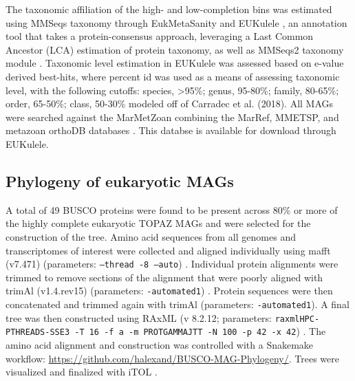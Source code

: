 \documentclass[12pt]{article}
\numberwithin{equation}{section}
\begin{document}
The taxonomic affiliation of the high- and low-completion bins was estimated using MMSeqs taxonomy through EukMetaSanity and EUKulele \citep{Krinos2021EUKulele}, an annotation tool that takes a protein-consensus approach, leveraging a Last Common Ancestor (LCA) estimation of protein taxonomy, as well as MMSeqs2 taxonomy module \citep{Steinegger2017, Steinegger2018, Mirdita2019}. Taxonomic level estimation in EUKulele was assessed based on e-value derived best-hits, where percent id was used as a means of assessing taxonomic level, with the following cutoffs: species, >95\%; genus, 95-80\%; family, 80-65\%; order, 65-50\%; class, 50-30\% modeled off of Carradec et al. (2018). All MAGs were searched against the MarMetZoan combining the MarRef, MMETSP, and metazoan orthoDB databases \citep{Johnson2018Re-assembly, Keeling2014, Kriventseva2018, Klemetsen:2017fg}. This databse is available for download through EUKulele. 

\subsection*{Phylogeny of eukaryotic MAGs} 
A total of 49 BUSCO proteins were found to be present across 80\% or more of the highly complete eukaryotic TOPAZ MAGs and were selected for the construction of the tree. Amino acid sequences from all genomes and transcriptomes of interest were collected and aligned individually using mafft (v7.471) (parameters: \texttt{--thread -8 –auto}) \citep{Katoh2013MAFFT}. Individual protein alignments were trimmed to remove sections of the alignment that were poorly aligned with trimAl (v1.4.rev15) (parameters: \texttt{-automated1}) \citep{Capella-Gutierrez2009trimAl}. Protein sequences were then concatenated and trimmed again with trimAl (parameters: \texttt{-automated1}). A final tree was then constructed using RAxML (v 8.2.12; parameters: \texttt{raxmlHPC-PTHREADS-SSE3 -T 16 -f a -m PROTGAMMAJTT -N 100 -p 42 -x 42}) \citep{Stamatakis2014RAxML}. The amino acid alignment and construction was controlled with a Snakemake workflow: \url{https://github.com/halexand/BUSCO-MAG-Phylogeny/}. Trees were visualized and finalized with iTOL \citep{Letunic2016Interactive}. 
\end{document}
